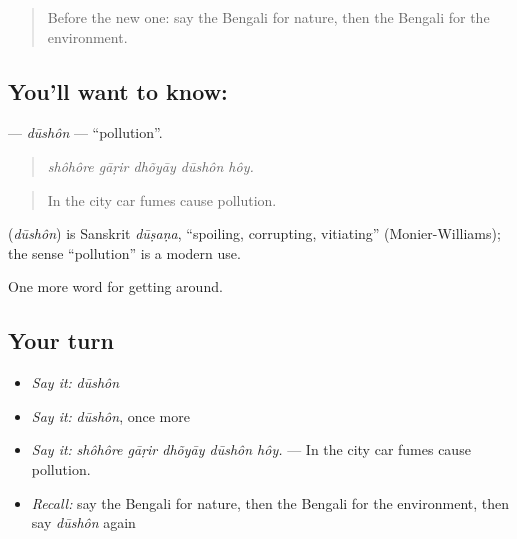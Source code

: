 \label{lesson:BN-C434-dushon}



\begin{quote}
Before the new one: say the Bengali for nature, then the Bengali for the environment.
\end{quote}

\subsection*{You'll want to know: }
\textbf{} — \emph{dūshôn} — \textquotedblleft{}pollution\textquotedblright{}.

\begin{quote}
    
\end{quote}

\begin{quote}
\emph{shôhôre gāṛir dhõyāy dūshôn hôy.}
\end{quote}

\begin{quote}
In the city car fumes cause pollution.
\end{quote}

\begin{cousinweb}
\textbf{} (\emph{dūshôn}) is Sanskrit \emph{dūṣaṇa}, \textquotedblleft{}spoiling, corrupting, vitiating\textquotedblright{} (Monier-Williams); the sense \textquotedblleft{}pollution\textquotedblright{} is a modern use.
\end{cousinweb}

\begin{grammarlens}[title={What you've built}]
One more word for getting around.
\end{grammarlens}

\subsection*{Your turn}
\begin{itemize}
\raggedright
  \item \emph{Say it:} \emph{dūshôn}
  \item \emph{Say it:} \emph{dūshôn}, once more
  \item \emph{Say it:} \emph{shôhôre gāṛir dhõyāy dūshôn hôy.} — In the city car fumes cause pollution.
  \item \emph{Recall:} say the Bengali for nature, then the Bengali for the environment, then say \emph{dūshôn} again
\end{itemize}

